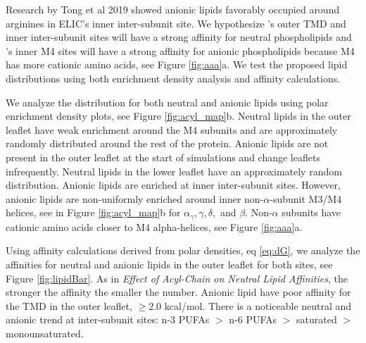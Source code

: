 Research by Tong et al 2019 \cite{Tong2019} showed anionic lipids favorably occupied around arginines in ELIC's inner inter-subunit site. We hypothesize \nachr's outer TMD and inner inter-subunit sites will have a strong affinity for neutral phospholipids and \nachr's inner M4 sites will have a strong affinity for anionic phospholipids because M4 has more cationic amino acids, see Figure \ref{fig:aaa}a. We test the proposed lipid distributions using both enrichment density analysis and affinity calculations.

We analyze the distribution for both neutral and anionic lipids using polar enrichment density plots, see Figure \ref{fig:acyl_map}b. Neutral lipids in the outer leaflet have weak enrichment around the M4 subunits and are approximately randomly distributed around the rest of the protein. Anionic lipids are not present in the outer leaflet at the start of simulations and change leaflets infrequently. Neutral lipids in the lower leaflet have an approximately random distribution. Anionic lipids are enriched at inner inter-subunit sites. However, anionic lipids are non-uniformly enriched around inner non-$\alpha$-subunit M3/M4 helices, see in Figure \ref{fig:acyl_map}b for $\alpha_{\gamma}, \gamma,\delta,$ and $\beta$. Non-$\alpha$ subunits have cationic amino acids closer to M4 alpha-helices, see Figure \ref{fig:aaa}a.


Using affinity calculations derived from polar densities, eq \ref{eq:dG}, we analyze the affinities for neutral and anionic lipids in the outer leaflet for both sites, see Figure \ref{fig:lipidBar}. As in \textit{Effect of Acyl-Chain on Neutral Lipid Affinities}, the stronger the affinity the smaller the number. Anionic lipid have poor affinity for the TMD in the outer leaflet, $\geq 2.0$ kcal/mol. There is a noticeable neutral and anionic trend at inter-subunit sites: n-3 PUFAs $>$ n-6 PUFAs $>$ saturated $>$ monounsaturated.  %

